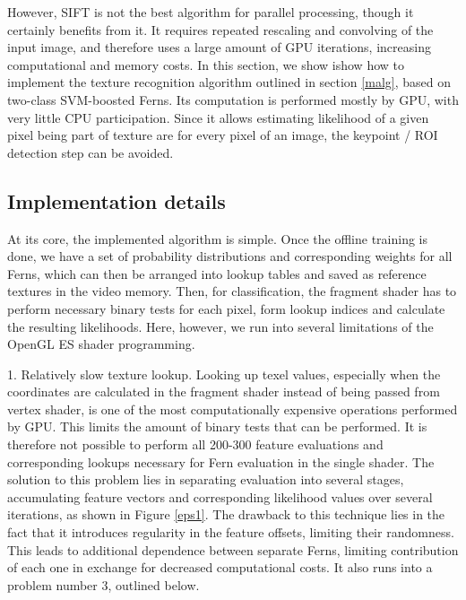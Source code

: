 \documentclass[10pt,twocolumn, a4paper]{article}
\begin{document}
However, SIFT is not the best algorithm for parallel processing, though it certainly benefits from it. It requires repeated rescaling and convolving of the input image, and therefore uses a large amount of GPU iterations, increasing computational and memory costs. 
 In this section, we show ishow how to implement the texture recognition algorithm outlined in section \ref{malg}, based on two-class SVM-boosted Ferns. Its computation is performed mostly by GPU, with very little CPU participation. Since it allows estimating likelihood of a given pixel being part of texture are for every pixel of an image, the keypoint / ROI detection step can be avoided.
\subsection{Implementation details}
At its core, the implemented algorithm is simple. Once the offline training is done, we have a set of probability distributions and corresponding weights for all Ferns, which can then be arranged into lookup tables and saved as reference textures in the video memory. Then, for classification, the fragment shader has to perform necessary binary tests for each pixel, form lookup indices and calculate the resulting likelihoods. Here, however, we run into several limitations of the OpenGL ES shader programming.

1.	Relatively slow texture lookup. Looking up texel values, especially when the coordinates are calculated in the fragment shader instead of being passed from vertex shader, is one of the most computationally expensive operations performed by GPU. This  limits the amount of binary tests that can be performed. It is therefore not possible to perform all 200-300 feature evaluations and corresponding lookups necessary for Fern evaluation in the single shader.  The solution to this problem lies in separating evaluation into several stages, accumulating feature vectors and corresponding likelihood values over several iterations, as shown in Figure \ref{eps1}. The drawback to this technique lies in the fact that it introduces regularity in the feature offsets, limiting their randomness. This leads to additional dependence between separate Ferns, limiting contribution of each one in exchange for decreased computational costs. It also runs into a problem number 3, outlined below. 
\end{document}
